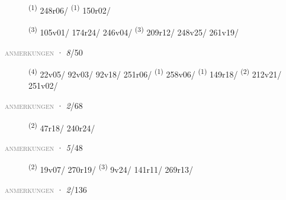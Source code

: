 \begin{description}
    \item[]  \textsuperscript{(1)} \mbox{248r06/} \CASEBREAK {} \textsuperscript{(1)} \mbox{150r02/}
    \item[]  \textsuperscript{(3)} \mbox{105v01/} \mbox{174r24/} \mbox{246v04/} \CASEBREAK {} \textsuperscript{(3)} \mbox{209r12/} \mbox{248v25/} \mbox{261v19/}
\end{description}
\textsc{\textcolor{gray}{anmerkungen}}
\ENTRYEND
\noindent{} · \textit{8}/50 \LEMMALINE
\begin{description}
    \item[]  \textsuperscript{(4)} \mbox{22v05/} \mbox{92v03/} \mbox{92v18/} \mbox{251r06/} \textsuperscript{(1)} \mbox{258v06/} \CASEBREAK {} \textsuperscript{(1)} \mbox{149r18/} \textsuperscript{(2)} \mbox{212v21/} \mbox{251v02/}
\end{description}
\textsc{\textcolor{gray}{anmerkungen}}
\ENTRYEND
\noindent{} · \textit{2}/68 \LEMMALINE
\begin{description}
    \item[]  \textsuperscript{(2)} \mbox{47r18/} \mbox{240r24/}
\end{description}
\textsc{\textcolor{gray}{anmerkungen}}
\ENTRYEND
\noindent{} · \textit{5}/48 \LEMMALINE
\begin{description}
    \item[]  \textsuperscript{(2)} \mbox{19v07/} \mbox{270r19/} \CASEBREAK {} \textsuperscript{(3)} \mbox{9v24/} \mbox{141r11/} \mbox{269r13/}
\end{description}
\textsc{\textcolor{gray}{anmerkungen}}
\ENTRYEND
\noindent{} · \textit{2}/136 \LEMMALINE
